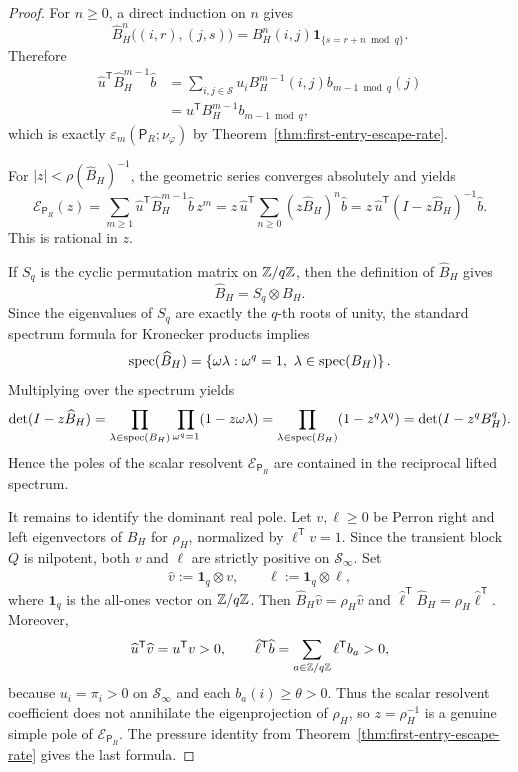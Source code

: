 \begin{proof}
For \(n\geq 0\), a direct induction on \(n\) gives
\[
  \widehat B_H^n\bigl((i,r),(j,s)\bigr)
  = B_H^n(i,j)\mathbf{1}_{\{s=r+n\bmod q\}}.
\]
Therefore
\begin{align*}
  \widehat u^{\mathsf T}\widehat B_H^{m-1}\widehat b
  &= \sum_{i,j\in\mathcal S}
      u_i B_H^{m-1}(i,j)b_{m-1\bmod q}(j) \\
  &= u^{\mathsf T}B_H^{m-1}b_{m-1\bmod q},
\end{align*}
which is exactly
\(\varepsilon_m(\mathsf{P}_R;\nu_\varphi)\) by
Theorem~\ref{thm:first-entry-escape-rate}.

For \(|z|<\rho(\widehat B_H)^{-1}\), the geometric series converges
absolutely and yields
\[
  \mathcal E_{\mathsf{P}_R}(z)
  = \sum_{m\geq 1}
      \widehat u^{\mathsf T}\widehat B_H^{m-1}\widehat b\,z^m
  = z\,\widehat u^{\mathsf T}
      \sum_{n\geq 0}(z\widehat B_H)^n\widehat b
  = z\,\widehat u^{\mathsf T}
      (I-z\widehat B_H)^{-1}\widehat b.
\]
This is rational in \(z\).

If \(S_q\) is the cyclic permutation matrix on \(\mathbb{Z}/q\mathbb{Z}\), then the
definition of \(\widehat B_H\) gives
\[
  \widehat B_H=S_q\otimes B_H.
\]
Since the eigenvalues of \(S_q\) are exactly the \(q\)-th roots of
unity, the standard spectrum formula for Kronecker products implies
\[
  \operatorname{spec}(\widehat B_H)
  = \left\{\omega\lambda:
         \omega^q=1,\ \lambda\in\operatorname{spec}(B_H)\right\}.
\]
Multiplying over the spectrum yields
\[
  \det(I-z\widehat B_H)
  = \prod_{\lambda\in\operatorname{spec}(B_H)}
      \prod_{\omega^q=1}(1-z\omega\lambda)
  = \prod_{\lambda\in\operatorname{spec}(B_H)}(1-z^q\lambda^q)
  = \det(I-z^q B_H^q).
\]
Hence the poles of the scalar resolvent
\(\mathcal E_{\mathsf{P}_R}\) are contained in the reciprocal lifted
spectrum.

It remains to identify the dominant real pole.  Let \(v,\ell\geq 0\) be
Perron right and left eigenvectors of \(B_H\) for \(\rho_H\), normalized
by \(\ell^{\mathsf T}v=1\).  Since the transient block \(Q\) is
nilpotent, both \(v\) and \(\ell\) are strictly positive on
\(\mathcal S_\infty\).  Set
\[
  \widehat v:=\mathbf{1}_q\otimes v,
  \qquad
  \widehat\ell:=\mathbf{1}_q\otimes \ell,
\]
where \(\mathbf{1}_q\) is the all-ones vector on \(\mathbb{Z}/q\mathbb{Z}\).  Then
\(\widehat B_H\widehat v=\rho_H\widehat v\) and
\(\widehat\ell^{\mathsf T}\widehat B_H=\rho_H\widehat\ell^{\mathsf T}\).
Moreover,
\[
  \widehat u^{\mathsf T}\widehat v=u^{\mathsf T}v>0,
  \qquad
  \widehat\ell^{\mathsf T}\widehat b
  = \sum_{a\in\mathbb{Z}/q\mathbb{Z}}\ell^{\mathsf T}b_a>0,
\]
because \(u_i=\pi_i>0\) on \(\mathcal S_\infty\) and each \(b_a(i)\geq
\theta>0\).  Thus the scalar resolvent coefficient does not annihilate
the eigenprojection of \(\rho_H\), so \(z=\rho_H^{-1}\) is a genuine
simple pole of \(\mathcal E_{\mathsf{P}_R}\).  The pressure identity
from Theorem~\ref{thm:first-entry-escape-rate} gives the last formula.
\end{proof}

